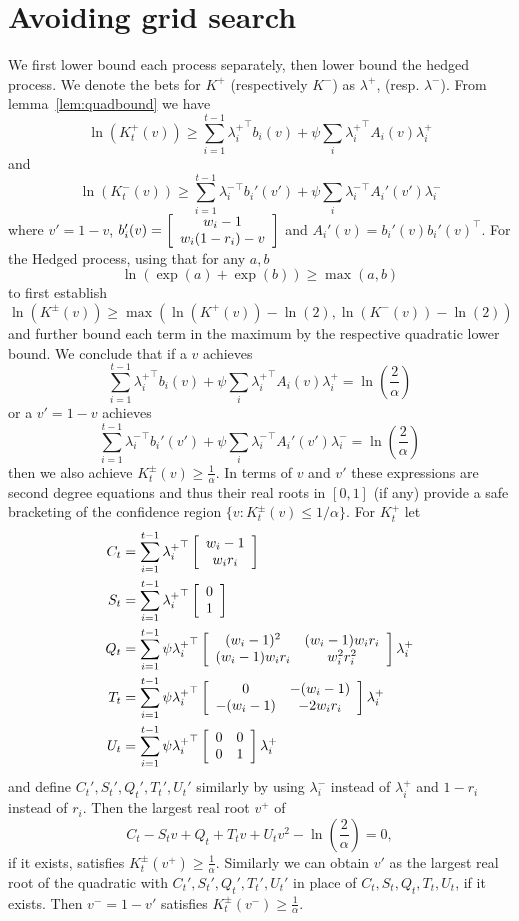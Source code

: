 \section{Avoiding grid search}
\label{app:nogrid2d}
We first lower bound each process separately, then lower bound
the hedged process. We denote the bets for $K^{+}$ (respectively
$K^{-}$) as $\lambda^{+}$, (resp. $\lambda^{-}$).
From lemma~\ref{lem:quadbound} we have
\[
\ln(K_t^{+}(v)) \geq \sum_{i=1}^{t-1} {\lambda_i^{+}}^\top b_i(v) + \psi \sum_i {\lambda_i^{+}}^\top A_i(v) {\lambda_i^{+}}
\]
and
\[
\ln(K_t^{-}(v)) \geq \sum_{i=1}^{t-1} {\lambda_i^{-}}^\top b_i'(v') + \psi \sum_i {\lambda_i^{-}}^\top A_i'(v') {\lambda_i^{-}}
\]
where $v'=1-v$, 
$b_i'(v)=
\left[\begin{array}{c} w_i-1 \\ w_i (1-r_i) -v \end{array}\right]
$
and $A_i'(v)=b_i'(v)b_i'(v)^\top$.
For the Hedged process, using that for any $a,b$
\[
\ln\left(\exp(a)+\exp(b)\right)\geq \max(a,b)
\]
to first establish
\[
\ln(K^{\pm}(v)) \geq \max(\ln(K^{+}(v))-\ln(2),\ln(K^{-}(v))-\ln(2))
\]
and further bound each term in the maximum by the respective 
quadratic lower bound. We conclude that
if a $v$ achieves 
\[
 \sum_{i=1}^{t-1} {\lambda_i^{+}}^\top b_i(v) + \psi \sum_i {\lambda_i^{+}}^\top A_i(v) \lambda_i^{+} = \ln\left(\frac{2}{\alpha}\right)
\]
or a $v'=1-v$ achieves 
\[
\sum_{i=1}^{t-1} {\lambda_i^{-}}^\top b_i'(v') + \psi \sum_i {\lambda_i^{-}}^\top A_i'(v') \lambda_i^{-} = \ln\left(\frac{2}{\alpha}\right)
\]
then we also achieve $K_t^{\pm}(v) \geq \frac{1}{\alpha}$.
In terms of $v$ and $v'$ these expressions are second degree
equations and thus their real roots in $[0,1]$ (if any) provide 
a safe bracketing of the confidence region $\{v:K_t^{\pm}(v)\leq 1/\alpha\}$. For $K_t^{+}$ let
\begin{align}
C_t&= \sum_{i=1}^{t-1} {\lambda_i^{+}}^\top \left[\begin{array}{c} w_i-1 \\ w_i r_i \end{array}\right] \label{eq:upsuffc}\\
S_t&= \sum_{i=1}^{t-1} {\lambda_i^{+}}^\top \left[\begin{array}{c} 0 \\ 1 \end{array}\right] \\
Q_t&= \sum_{i=1}^{t-1} \psi  {\lambda_i^{+}}^\top \left[\begin{array}{cc} (w_i-1)^2 & (w_i-1)w_i r_i \\ (w_i-1)w_i r_i & w_i^2r_i^2 \end{array}\right] \lambda_i^{+} \\
T_t&= \sum_{i=1}^{t-1} \psi  {\lambda_i^{+}}^\top \left[\begin{array}{cc} 0 & -(w_i-1) \\ -(w_i-1) & -2w_ir_i \end{array}\right] \lambda_i^{+} \\
U_t&=  \sum_{i=1}^{t-1} \psi {\lambda_i^{+}}^\top \left[\begin{array}{cc} 0 & 0 \\ 0 & 1 \end{array}\right] \lambda_i^{+} \label{eq:upsuffu}
\end{align}
and define $C_t',S_t',Q_t',T_t',U_t'$ similarly by using $\lambda_i^{-}$ 
instead of $\lambda_i^{+}$ and $1-r_i$ instead of $r_i$. Then
the largest real root $v^{+}$ of
\[
C_t - S_t v + Q_t + T_t v + U_t v^2 - \ln\left(\frac{2}{\alpha}\right) = 0,
\]
if it exists, satisfies $K_t^{\pm}(v^{+})\geq \frac{1}{\alpha}$. Similarly
we can obtain $v'$ as the largest real root of the quadratic
with $C_t',S_t',Q_t',T_t',U_t'$ in place of $C_t,S_t,Q_t,T_t,U_t$,
if it exists. Then $v^{-}=1-v'$ satisfies $K_t^{\pm}(v^{-})\geq \frac{1}{\alpha}$.



